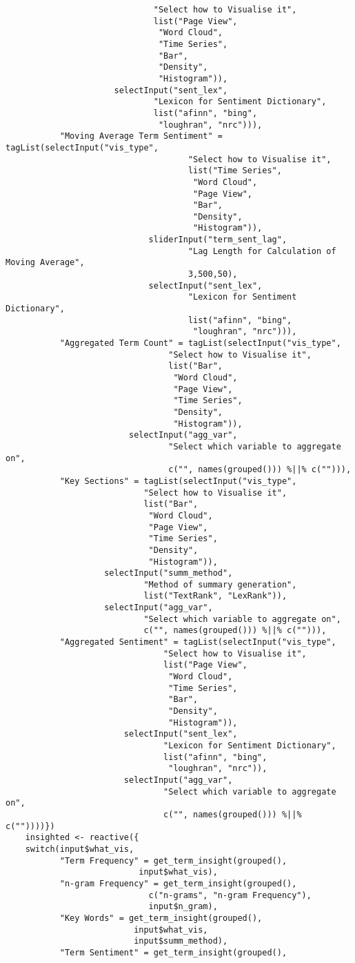 \documentclass[a4paper, 11pt]{article}
\begin{document}
\begin{verbatim}
						      "Select how to Visualise it",
						      list("Page View",
							   "Word Cloud",
							   "Time Series",
							   "Bar",
							   "Density",
							   "Histogram")),
					  selectInput("sent_lex",
						      "Lexicon for Sentiment Dictionary",
						      list("afinn", "bing",
							   "loughran", "nrc"))),
	       "Moving Average Term Sentiment" = tagList(selectInput("vis_type",
								     "Select how to Visualise it",
								     list("Time Series",
									  "Word Cloud",
									  "Page View",
									  "Bar",
									  "Density",
									  "Histogram")),
							 sliderInput("term_sent_lag",
								     "Lag Length for Calculation of Moving Average",
								     3,500,50),
							 selectInput("sent_lex",
								     "Lexicon for Sentiment Dictionary",
								     list("afinn", "bing",
									  "loughran", "nrc"))),
	       "Aggregated Term Count" = tagList(selectInput("vis_type",
							     "Select how to Visualise it",
							     list("Bar",
								  "Word Cloud",
								  "Page View",
								  "Time Series",
								  "Density",
								  "Histogram")),
						 selectInput("agg_var",
							     "Select which variable to aggregate on",
							     c("", names(grouped())) %||% c(""))),
	       "Key Sections" = tagList(selectInput("vis_type",
						    "Select how to Visualise it",
						    list("Bar",
							 "Word Cloud",
							 "Page View",
							 "Time Series",
							 "Density",
							 "Histogram")),
					selectInput("summ_method",
						    "Method of summary generation",
						    list("TextRank", "LexRank")),
					selectInput("agg_var",
						    "Select which variable to aggregate on",
						    c("", names(grouped())) %||% c(""))),
	       "Aggregated Sentiment" = tagList(selectInput("vis_type",
							    "Select how to Visualise it",
							    list("Page View",
								 "Word Cloud",
								 "Time Series",
								 "Bar",
								 "Density",
								 "Histogram")),
						selectInput("sent_lex",
							    "Lexicon for Sentiment Dictionary",
							    list("afinn", "bing",
								 "loughran", "nrc")),
						selectInput("agg_var",
							    "Select which variable to aggregate on",
							    c("", names(grouped())) %||% c(""))))})
    insighted <- reactive({
	switch(input$what_vis,
	       "Term Frequency" = get_term_insight(grouped(),
						   input$what_vis),
	       "n-gram Frequency" = get_term_insight(grouped(),
						     c("n-grams", "n-gram Frequency"),
						     input$n_gram),
	       "Key Words" = get_term_insight(grouped(),
					      input$what_vis,
					      input$summ_method),
	       "Term Sentiment" = get_term_insight(grouped(),

\end{verbatim}
\end{document}
